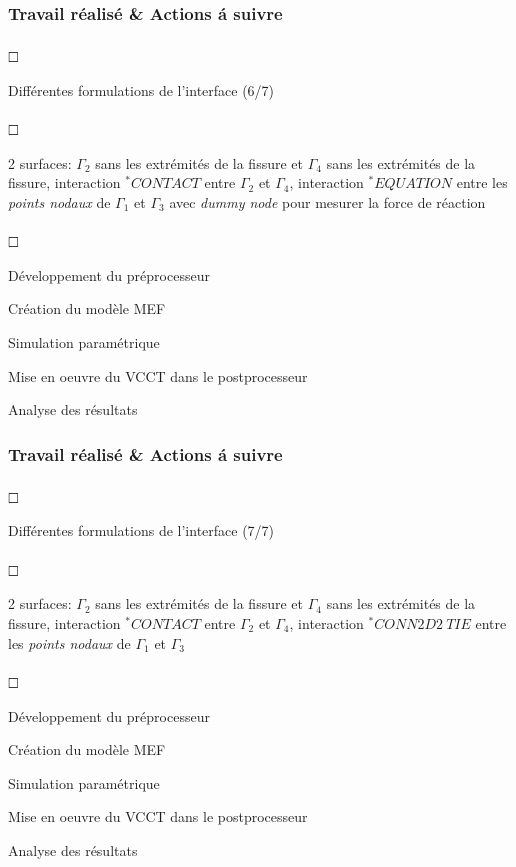 \documentclass[first,firstsupp,lastsupp,handout,last,hyperref,table]{ETHclass}
\begin{document}
\begin{frame}
\frametitle{Travail r\'ealis\'e \& Actions \'a suivre}
\vspace{-0.5cm}
\scriptsize
\begin{list}{$\text{\rlap{\textcolor{white}{\huge$\mathbf{\checkmark}$}}}\square$}{}  
\item Diff\'erentes formulations de l'interface (6/7)
\begin{list}{$\text{\rlap{\textcolor{white}{\huge$\mathbf{\checkmark}$}}}\square$}{}  
\item  2 surfaces: $\Gamma_{2}$ sans les extr\'emit\'es de la fissure et $\Gamma_{4}$ sans les extr\'emit\'es de la fissure, interaction $^{*}CONTACT$ entre  $\Gamma_{2}$ et $\Gamma_{4}$, interaction $^{*}EQUATION$ entre les \textit{points nodaux} de $\Gamma_{1}$ et $\Gamma_{3}$ avec \textit{dummy node} pour mesurer la force de r\'eaction
\begin{list}{$\text{\rlap{\textcolor{white}{\huge$\mathbf{\checkmark}$}}}\square$}{}  
\item D\'eveloppement du pr\'eprocesseur
\item Cr\'eation du mod\`ele MEF
\item Simulation param\'etrique
\item Mise en oeuvre du VCCT dans le postprocesseur
\item Analyse des r\'esultats
\end{list}
\end{list}
\end{list}
\end{frame}

\begin{frame}
\frametitle{Travail r\'ealis\'e \& Actions \'a suivre}
\vspace{-0.5cm}
\scriptsize
\begin{list}{$\text{\rlap{\textcolor{white}{\huge$\mathbf{\checkmark}$}}}\square$}{}  
\item Diff\'erentes formulations de l'interface (7/7)
\begin{list}{$\text{\rlap{\textcolor{white}{\huge$\mathbf{\checkmark}$}}}\square$}{}  
\item  2 surfaces: $\Gamma_{2}$ sans les extr\'emit\'es de la fissure et $\Gamma_{4}$ sans les extr\'emit\'es de la fissure, interaction $^{*}CONTACT$ entre  $\Gamma_{2}$ et $\Gamma_{4}$, interaction $^{*}CONN2D2\ TIE$ entre les \textit{points nodaux} de $\Gamma_{1}$ et $\Gamma_{3}$
\begin{list}{$\text{\rlap{\textcolor{white}{\huge$\mathbf{\checkmark}$}}}\square$}{}  
\item D\'eveloppement du pr\'eprocesseur
\item Cr\'eation du mod\`ele MEF
\item Simulation param\'etrique
\item Mise en oeuvre du VCCT dans le postprocesseur
\item Analyse des r\'esultats
\end{list}
\end{list}
\end{list}
\end{frame}
\end{document}
